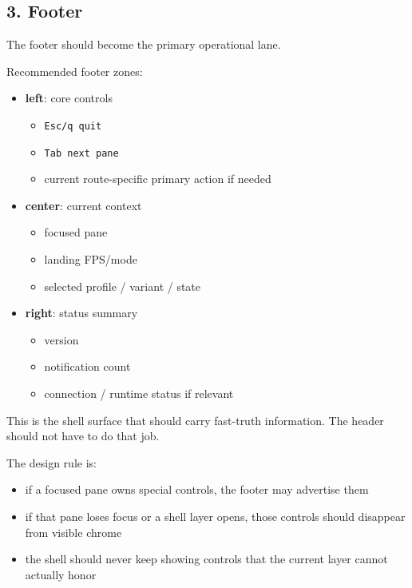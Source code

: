 \subsection{3. Footer}\label{record-047-footer}

The footer should become the primary operational lane.

Recommended footer zones:

\begin{itemize}
\tightlist
\item
  \textbf{left}: core controls

  \begin{itemize}
  \tightlist
  \item
    \texttt{E\allowbreak{}s\allowbreak{}c\allowbreak{}/\allowbreak{}q\allowbreak{} \allowbreak{}q\allowbreak{}u\allowbreak{}i\allowbreak{}t}
  \item
    \texttt{T\allowbreak{}a\allowbreak{}b\allowbreak{} \allowbreak{}n\allowbreak{}e\allowbreak{}x\allowbreak{}t\allowbreak{} \allowbreak{}p\allowbreak{}a\allowbreak{}n\allowbreak{}e}
  \item
    current route-specific primary action if needed
  \end{itemize}
\item
  \textbf{center}: current context

  \begin{itemize}
  \tightlist
  \item
    focused pane
  \item
    landing FPS/mode
  \item
    selected profile / variant / state
  \end{itemize}
\item
  \textbf{right}: status summary

  \begin{itemize}
  \tightlist
  \item
    version
  \item
    notification count
  \item
    connection / runtime status if relevant
  \end{itemize}
\end{itemize}

This is the shell surface that should carry fast-truth information. The header should not have to do that job.

The design rule is:

\begin{itemize}
\tightlist
\item
  if a focused pane owns special controls, the footer may advertise them
\item
  if that pane loses focus or a shell layer opens, those controls should disappear from visible chrome
\item
  the shell should never keep showing controls that the current layer cannot actually honor
\end{itemize}

